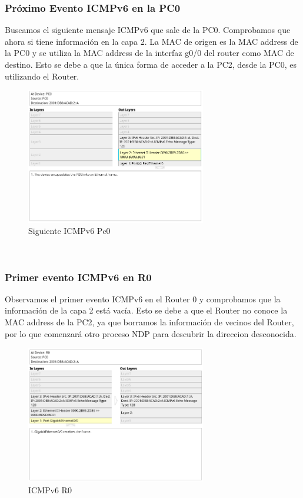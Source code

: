 \documentclass[a4paper,12pt]{article}
\begin{document}
\subsubsection{Próximo Evento ICMPv6 en la PC0}
Buscamos el siguiente mensaje ICMPv6 que sale de la PC0. Comprobamos que ahora si tiene información en la capa 2. La MAC de origen es la MAC address de la PC0 y se utiliza la MAC address de la interfaz g0/0 del router como MAC de destino. Esto se debe a que la única forma de acceder a la PC2, desde la PC0, es utilizando el Router.\\
\begin{figure}[h]
    \centering
    \includegraphics[width=0.7\textwidth]{imagenes/3.png}
    \caption{Siguiente ICMPv6 Pc0}
\end{figure}\\
\FloatBarrier
\subsubsection{Primer evento ICMPv6 en R0}
Observamos el primer evento ICMPv6 en el  Router 0 y comprobamos que la información de la capa 2 está vacía. Esto se debe a que el Router no conoce la MAC address de la PC2, ya que borramos la información de vecinos del Router, por lo que comenzará otro proceso NDP para descubrir la direccion desconocida. \\
\begin{figure}[h]
    \centering
    \includegraphics[width=0.7\textwidth]{imagenes/4.png}
    \caption{ICMPv6 R0}
\end{figure}\\
\end{document}
